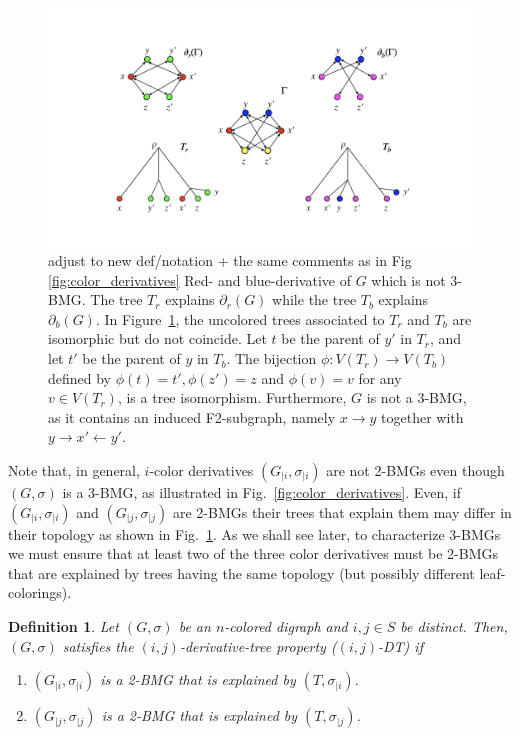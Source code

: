\documentclass[final,3p,times]{elsarticle}
\newtheorem{definition}{Definition}[section]
\newtheorem{example}{Example}[section]
\newcommand{\TODO}[1]{\begingroup\color{red}#1\endgroup}
\newcommand{\mh}[1]{\begingroup\color{blue}#1\endgroup}
\begin{document}
\begin{figure}[ht]
  \centering
    \includegraphics[width=16cm]{figures/different_trees.png}
    \caption{
    	\TODO{adjust to new def/notation + the same comments as in Fig \ref{fig:color_derivatives}}
    	Red- and blue-derivative of $G$ which is not 3-BMG. The tree $T_r$ explains $\partial_r(G)$ while the tree $T_b$ explains $\partial_b(G)$.
    	In Figure~\ref{fig:different_trees}, the uncolored trees associated to
    	$T_r$ and $T_b$ are isomorphic but do not coincide. Let $t$ be the
    	parent of $y'$ in $T_r$, and let $t'$ be the parent of $y$ in $T_b$. The
    	bijection $\phi:V(T_r)\rightarrow V(T_b)$ defined by
    	$\phi(t)=t',\phi(z')=z$ and $\phi(v)=v$ for any $v\in V(T_r)$, is a tree
    	isomorphism. Furthermore, $G$ is not a 3-BMG, as it contains an
    	induced F2-subgraph, namely $x\rightarrow y$ together with $y\rightarrow
    	x'\leftarrow y'$. }
    \label{fig:different_trees}
\end{figure}


\mh{
Note that, in general, $i$-color derivatives $(G_{|i},\sigma_{|i})$ are not
2-BMGs even though $(G,\sigma)$ is a 3-BMG, as illustrated in Fig.\
\ref{fig:color_derivatives}. 
Even, if $(G_{|i},\sigma_{|i})$ and $(G_{|j},\sigma_{|j})$ are 2-BMGs
their trees that explain them may differ in their topology as shown 
in Fig.\ \ref{fig:different_trees}.
As we shall see later,  to characterize 3-BMGs we must ensure that 
at least two of the three color derivatives must be 2-BMGs that are explained by 
trees having the same topology (but possibly different leaf-colorings). 
}
\begin{definition}
\mh{
Let $(G,\sigma)$ be an $n$-colored digraph and $i,j\in S$ be distinct. 
Then, $(G,\sigma)$ satisfies the \mh{$(i,j)$-derivative-tree property ($(i,j)$-DT)}
if 
\begin{enumerate}
	\item $(G_{|i},\sigma_{|i})$ is a 2-BMG that is explained by $(T,\sigma_{|i})$.
	\item $(G_{|j},\sigma_{|j})$ is a 2-BMG that is explained by $(T,\sigma_{|j})$.
\end{enumerate}
}
\end{definition}
\end{document}
